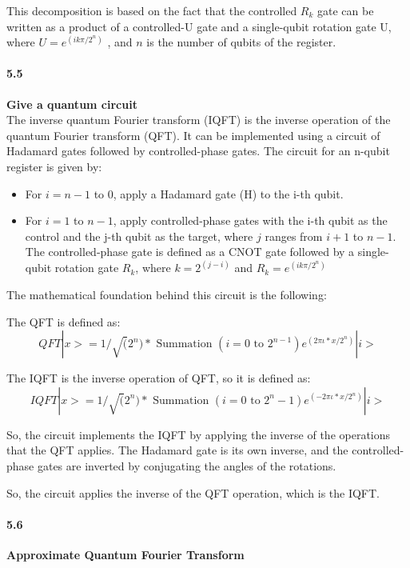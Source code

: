 This decomposition is based on the fact that the controlled $R_k$ gate can be written as a product of a controlled-U gate and a single-qubit rotation gate U, where $U = e^{(ik\pi/2^n)}$ , and $n$ is the number of qubits of the register.

\paragraph{5.5} \textbf{Give a quantum circuit}
\\

The inverse quantum Fourier transform (IQFT) is the inverse operation of the quantum Fourier transform (QFT). It can be implemented using a circuit of Hadamard gates followed by controlled-phase gates. The circuit for an n-qubit register is given by:
\begin{itemize}
    

\item  For $i = n-1$ to $0$, apply a Hadamard gate (H) to the i-th qubit.
\item  For $i = 1$ to $n-1$, apply controlled-phase gates with the i-th qubit as the control and the j-th qubit as the target, where $j$ ranges from $i+1$ to $n-1$. The controlled-phase gate is defined as a CNOT gate followed by a single-qubit rotation gate $R_k$, where $k = 2^{(j-i)}$ and $R_k = e^{(ik\pi/2^n)}$

\end{itemize}
The mathematical foundation behind this circuit is the following:

The QFT is defined as:
$$ QFT|x> = 1/\sqrt(2^n) * \text{ Summation } (i=0 \text{ to } 2^{n-1}) e^{(2\pi \iota*x/2^n)} |i>$$

The IQFT is the inverse operation of QFT, so it is defined as:
$$ IQFT|x> = 1/\sqrt(2^n) * \text{ Summation } (i=0 \text{ to } 2^n-1) e^{(-2 \pi \iota *x/2^n)} |i>$$

So, the circuit implements the IQFT by applying the inverse of the operations that the QFT applies. The Hadamard gate is its own inverse, and the controlled-phase gates are inverted by conjugating the angles of the rotations.

So, the circuit applies the inverse of the QFT operation, which is the IQFT.

\paragraph{5.6} \textbf{Approximate Quantum Fourier Transform}
\\

